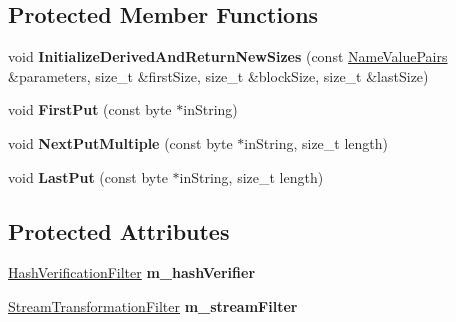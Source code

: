\subsection*{Protected Member Functions}
\begin{DoxyCompactItemize}
\item 
\hypertarget{class_authenticated_decryption_filter_a823f7afd7c771a650b3ab69e1d3969f6}{
void {\bfseries InitializeDerivedAndReturnNewSizes} (const \hyperlink{class_name_value_pairs}{NameValuePairs} \&parameters, size\_\-t \&firstSize, size\_\-t \&blockSize, size\_\-t \&lastSize)}
\label{class_authenticated_decryption_filter_a823f7afd7c771a650b3ab69e1d3969f6}

\item 
\hypertarget{class_authenticated_decryption_filter_a8ad01063cee060a33b3492172de00d43}{
void {\bfseries FirstPut} (const byte $\ast$inString)}
\label{class_authenticated_decryption_filter_a8ad01063cee060a33b3492172de00d43}

\item 
\hypertarget{class_authenticated_decryption_filter_a09e05fefb7013656e0e8ff0990800672}{
void {\bfseries NextPutMultiple} (const byte $\ast$inString, size\_\-t length)}
\label{class_authenticated_decryption_filter_a09e05fefb7013656e0e8ff0990800672}

\item 
\hypertarget{class_authenticated_decryption_filter_a38beffeca5b3cf9cbe05372cb9b6afc5}{
void {\bfseries LastPut} (const byte $\ast$inString, size\_\-t length)}
\label{class_authenticated_decryption_filter_a38beffeca5b3cf9cbe05372cb9b6afc5}

\end{DoxyCompactItemize}
\subsection*{Protected Attributes}
\begin{DoxyCompactItemize}
\item 
\hypertarget{class_authenticated_decryption_filter_a8ead8177ea59901ec0cc229ef5522644}{
\hyperlink{class_hash_verification_filter}{HashVerificationFilter} {\bfseries m\_\-hashVerifier}}
\label{class_authenticated_decryption_filter_a8ead8177ea59901ec0cc229ef5522644}

\item 
\hypertarget{class_authenticated_decryption_filter_adbe670384d1d4d9eb3bd68f2e76f9b19}{
\hyperlink{class_stream_transformation_filter}{StreamTransformationFilter} {\bfseries m\_\-streamFilter}}
\label{class_authenticated_decryption_filter_adbe670384d1d4d9eb3bd68f2e76f9b19}

\end{DoxyCompactItemize}


